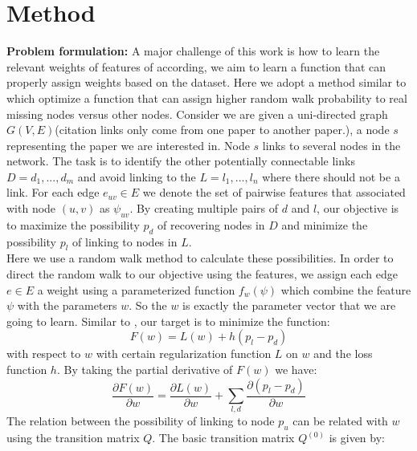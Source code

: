 \documentclass{article} %
\begin{document}
\section{Method}
\textbf{Problem formulation:} A major challenge of this work is how to learn the relevant weights of features of according, we aim to learn a function that can properly assign weights based on the dataset. Here we adopt a method similar to \cite{Backstrom:2011:SRW:1935826.1935914} which optimize a function that can assign higher random walk probability to real missing nodes versus other nodes. Consider we are given a uni-directed graph $G(V,E)$(citation links only come from one paper to another paper.), a node $s$ representing the paper we are interested in. Node $s$ links to several nodes in the network. The task is to identify the other potentially connectable links $D={d_1,...,d_m}$ and avoid linking to the $L={l_1,...,l_n}$ where there should not be a link. For each edge $e_{uv}\in E$ we denote the set of pairwise features that associated with node $(u,v)$ as $\psi_{uv}$. By creating multiple pairs of $d$ and $l$, our objective is to maximize the possibility $p_d$ of recovering nodes in $D$ and minimize the possibility $p_l$ of linking to nodes in $L$. \\
	Here we use a random walk method to calculate these possibilities. In order to direct the random walk to our objective using the features, we assign each edge $e \in E$ a weight using a parameterized function $f_w(\psi)$ which combine the feature $\psi$ with the parameters $w$. So the $w$ is exactly the parameter vector that we are going to learn. Similar to \cite{Backstrom:2011:SRW:1935826.1935914}, our target is to minimize the function:
\begin{equation}
F(w)=L(w) + h(p_l - p_d)
\end{equation} 
with respect to $w$ with certain regularization function $L$ on $w$ and the loss function $h$. By taking the partial derivative of $F(w)$ we have:
\begin{equation}
\frac{\partial F(w)}{\partial w} = \frac{\partial L(w)}{\partial w} + \sum_{l,d} \frac{\partial(p_l-p_d)}{\partial w}
\end{equation}
	The relation between the possibility of linking to node $p_u$ can be related with $w$ using the transition matrix $Q$. The basic transition matrix $Q^{(0)}$ is given by:
\end{document}
